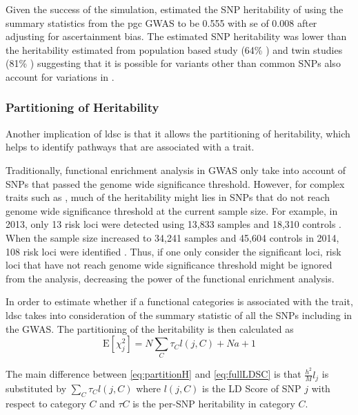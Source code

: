 \documentclass[12pt]{scrbook}
\newcommand*{\glng}{\glsentrylong}
\begin{document}
	Given the success of the simulation, \citet{Bulik-Sullivan2015} estimated the \gls{SNP} heritability of \glng{scz} using the summary statistics from the \gls{pgc} \glng{scz} \gls{GWAS} \citep{Ripke2014} to be 0.555 with \gls{se} of 0.008 after adjusting for ascertainment bias.
	The estimated \gls{SNP} heritability was lower than the heritability estimated from population based study (64\% \citep{Lichtenstein2009}) and twin studies (81\% \citep{Sullivan2003}) suggesting that it is possible for variants other than common \glspl{SNP} also account for variations in \glng{scz}.
	
	\subsubsection{Partitioning of Heritability}
	Another implication of \gls{ldsc} is that it allows the partitioning of heritability, which helps to identify pathways that are associated with a trait.
	
	Traditionally, functional enrichment analysis in \gls{GWAS} only take into account of \glspl{SNP} that passed the genome wide significance threshold. 
	However, for complex traits such as \glng{scz}, much of the heritability might lies in \glspl{SNP} that do not reach genome wide significance threshold at the current sample size.
	For example, in 2013, only 13 risk loci were detected using 13,833 \glng{scz} samples and 18,310 controls \citep{Ripke2013}. 
	When the sample size increased to 34,241 \glng{scz} samples and 45,604 controls in 2014, 108 risk loci were identified \citep{Ripke2014}. 
	Thus, if one only consider the significant loci, risk loci that have not reach genome wide significance threshold might be ignored from the analysis, decreasing the power of the functional enrichment analysis.
	
	In order to estimate whether if a functional categories is associated with the trait, \gls{ldsc} takes into consideration of the summary statistic of all the \glspl{SNP} including in the \gls{GWAS}.
	The partitioning of the heritability is then calculated as 
	\begin{equation}
	\mathrm{E}[\chi^2_j] = N\sum_C\tau_Cl(j,C)+Na+1
	\label{eq:partitionH}
	\end{equation}
	
	The main difference between \cref{eq:partitionH} and \cref{eq:fullLDSC} is that $\frac{h^2}{M}l_j$ is substituted by $\sum_C\tau_Cl(j,C)$ where $l(j,C)$ is the \gls{LD} Score of \gls{SNP} $j$ with respect to category $C$ and $\tau C$ is the per-\gls{SNP} heritability in category $C$.
	
\end{document}
